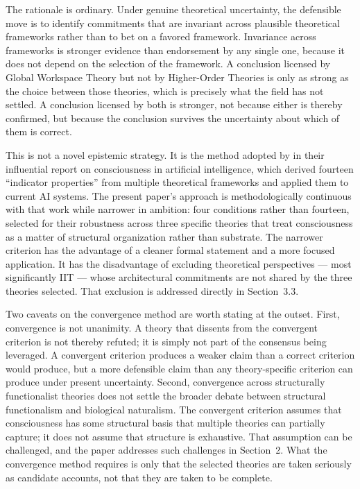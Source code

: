\documentclass[11pt]{article}
\theoremstyle{foundation}
\begin{document}
The rationale is ordinary. Under genuine theoretical uncertainty, the defensible move is to identify commitments that are invariant across plausible theoretical frameworks rather than to bet on a favored framework. Invariance across frameworks is stronger evidence than endorsement by any single one, because it does not depend on the selection of the framework. A conclusion licensed by Global Workspace Theory but not by Higher-Order Theories is only as strong as the choice between those theories, which is precisely what the field has not settled. A conclusion licensed by both is stronger, not because either is thereby confirmed, but because the conclusion survives the uncertainty about which of them is correct.

This is not a novel epistemic strategy. It is the method adopted by \citet{Butlin2023} in their influential report on consciousness in artificial intelligence, which derived fourteen ``indicator properties'' from multiple theoretical frameworks and applied them to current AI systems. The present paper's approach is methodologically continuous with that work while narrower in ambition: four conditions rather than fourteen, selected for their robustness across three specific theories that treat consciousness as a matter of structural organization rather than substrate. The narrower criterion has the advantage of a cleaner formal statement and a more focused application. It has the disadvantage of excluding theoretical perspectives --- most significantly IIT --- whose architectural commitments are not shared by the three theories selected. That exclusion is addressed directly in Section~3.3.

Two caveats on the convergence method are worth stating at the outset. First, convergence is not unanimity. A theory that dissents from the convergent criterion is not thereby refuted; it is simply not part of the consensus being leveraged. A convergent criterion produces a weaker claim than a correct criterion would produce, but a more defensible claim than any theory-specific criterion can produce under present uncertainty. Second, convergence across structurally functionalist theories does not settle the broader debate between structural functionalism and biological naturalism. The convergent criterion assumes that consciousness has some structural basis that multiple theories can partially capture; it does not assume that structure is exhaustive. That assumption can be challenged, and the paper addresses such challenges in Section~2. What the convergence method requires is only that the selected theories are taken seriously as candidate accounts, not that they are taken to be complete.
\end{document}
